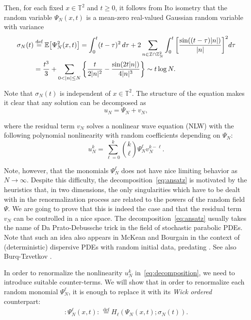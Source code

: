 \documentclass[letterpaper, 11pt,  reqno]{amsart}
\newcommand{\1}{\hspace{0.5mm}\text{I}\hspace{0.5mm}}
\newcommand{\I}{\mathcal{I}}
\newcommand{\noi}{\noindent}
\newcommand{\Z}{\mathbb{Z}}
\newcommand{\T}{\mathbb{T}}
\newcommand{\E}{\mathbb{E}}
\newcommand{\s}{\sigma}
\renewcommand{\l}{\ell}
\numberwithin{equation}{section}
\numberwithin{theorem}{section}
\begin{document}
\noi
Then, 
for each fixed $x \in \T^2$ and $t \geq 0$,  
 it follows from  Ito isometry
that the random variable $\Psi_N(x, t)$
 is a mean-zero real-valued Gaussian random variable with variance
\begin{align}
\s_N(t) &  \stackrel{\text{def}}{=} \E \big[\Psi_N^2(x, t)\big]
 = \int_0^t (t-\tau)^2\, d\tau
+ 2 \sum_{n \in \I \cap \Z^2_N}%
\int_0^t \bigg[\frac{\sin((t - \tau)|n|)}{|n|} \bigg]^2 d\tau
\notag \\
& = \frac{t^3}{3} +  \sum_{0< |n|\leq N} \bigg\{ \frac{t}{2 |n|^2} - \frac{\sin (2 t |n|)}{4|n|^3 }\bigg\}\sim  t \log N.
\label{sig1}
\end{align}




\noi
Note that $\s_N(t)$ is independent of $x \in \T^2$.
The structure of the equation makes it clear that any solution can be decomposed as 
\begin{equation}
\label{eq:ansatz}
u_N = \Psi_N + v_N, 
\end{equation}

\noi
where the residual term $v_N$ solves a nonlinear wave equation (NLW) with 
the following  polynomial nonlinearity 
with random coefficients depending on $\Psi_N$:
\begin{equation}
\label{eq:decomposition}
u_N^k = \sum_{\ell=0}^k {k\choose \ell} \Psi_N^\ell v_N^{k-\ell}.
\end{equation}


\noi
Note, however, that
  the monomials $\Psi_N^\ell$ does not have nice limiting behavior as $N\to \infty$. 
  Despite this difficulty,  the decomposition~\eqref{eq:ansatz} is motivated by the heuristics that, in two dimensions, the only singularities which have to be dealt with in the renormalization process are related to the powers of the random field $\Psi$. We are going to prove that this is indeed the case and that the residual term $v_N$ can be controlled in a nice space. The decomposition~\eqref{eq:ansatz} usually takes the name of Da Prato-Debussche trick \cite{DPD}
in the field of stochastic parabolic  PDEs.
Note that such an idea also appears in 
McKean \cite{McKean} and 
Bourgain \cite{BO96} in the context of (deterministic) dispersive PDEs with random initial data, predating \cite{DPD}. See also Burq-Tzvetkov \cite{BT1}.
 
In order to renormalize the nonlinearity $u_N^k$ in~\eqref{eq:decomposition},
 we need to introduce suitable counter-terms. We will show that in order to renormalize 
 each random monomial $\Psi^\ell_N$,
  it is enough to replace it with its \emph{Wick ordered} counterpart: 
\begin{align}
:\!\Psi^\l_N(x, t) \!: \, \stackrel{\text{def}}{=} H_\ell(\Psi_N(x, t);\sigma_N(t)).
\label{Herm1}
\end{align}
\end{document}
